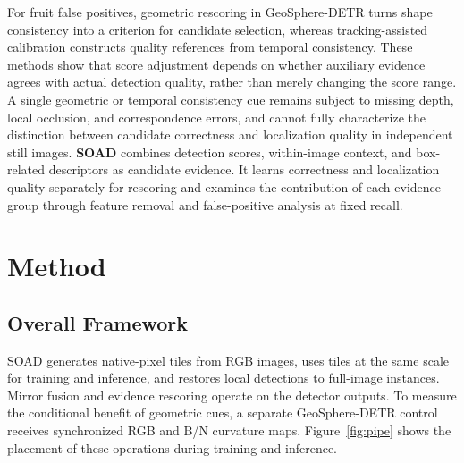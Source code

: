 \documentclass[11pt,a4paper]{article}
\begin{document}
For fruit false positives, geometric rescoring in GeoSphere-DETR \cite{geosphere} turns shape consistency into a criterion for candidate selection, whereas tracking-assisted calibration \cite{trackcal} constructs quality references from temporal consistency. These methods show that score adjustment depends on whether auxiliary evidence agrees with actual detection quality, rather than merely changing the score range. A single geometric or temporal consistency cue remains subject to missing depth, local occlusion, and correspondence errors, and cannot fully characterize the distinction between candidate correctness and localization quality in independent still images. \textbf{SOAD} combines detection scores, within-image context, and box-related descriptors as candidate evidence. It learns correctness and localization quality separately for rescoring and examines the contribution of each evidence group through feature removal and false-positive analysis at fixed recall.

\section{Method}
\subsection{Overall Framework}
SOAD generates native-pixel tiles from RGB images, uses tiles at the same scale for training and inference, and restores local detections to full-image instances. Mirror fusion and evidence rescoring operate on the detector outputs. To measure the conditional benefit of geometric cues, a separate GeoSphere-DETR control receives synchronized RGB and B/N curvature maps. Figure~\ref{fig:pipe} shows the placement of these operations during training and inference.
\end{document}
